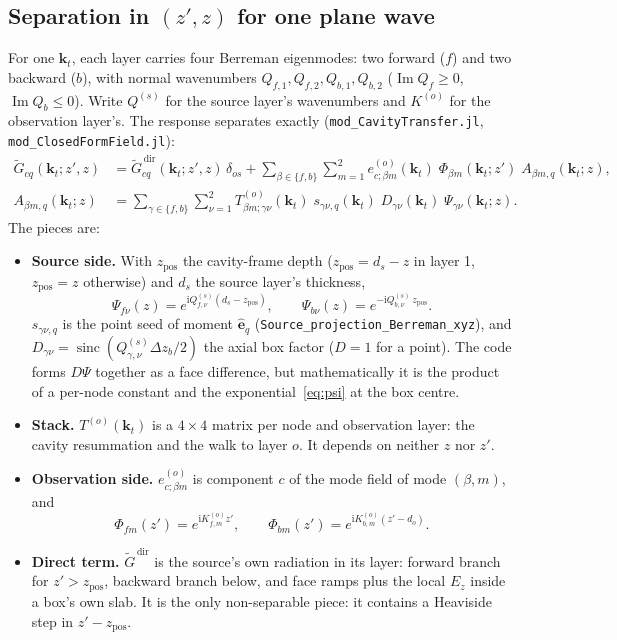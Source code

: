 \documentclass[11pt,a4paper]{article}
\newcommand{\code}[1]{\texttt{#1}}
\newcommand{\kt}{\mathbf{k}_t}
\newcommand{\ii}{\mathrm{i}}
\newcommand{\sinc}{\operatorname{sinc}}
\theoremstyle{remark}
\begin{document}
\subsection{Separation in $(z', z)$ for one plane wave}

For one $\kt$, each layer carries four Berreman eigenmodes: two forward ($f$) and two
backward ($b$), with normal wavenumbers $Q_{f,1}, Q_{f,2}, Q_{b,1}, Q_{b,2}$
($\operatorname{Im} Q_f \ge 0$, $\operatorname{Im} Q_b \le 0$). Write $Q^{(s)}$ for the
source layer's wavenumbers and $K^{(o)}$ for the observation layer's. The response
separates exactly (\code{mod\_CavityTransfer.jl}, \code{mod\_ClosedFormField.jl}):
\begin{align}
  \widetilde{G}_{cq}(\kt; z', z)
  &= \widetilde{G}^{\,\mathrm{dir}}_{cq}(\kt; z', z)\,\delta_{os}
   + \sum_{\beta\in\{f,b\}}\sum_{m=1}^{2}
     e^{(o)}_{c;\beta m}(\kt)\;\Phi_{\beta m}(\kt; z')\; A_{\beta m, q}(\kt; z),
  \label{eq:separation}\\
  A_{\beta m, q}(\kt; z)
  &= \sum_{\gamma\in\{f,b\}}\sum_{\nu=1}^{2}
     T^{(o)}_{\beta m;\gamma\nu}(\kt)\; s_{\gamma\nu, q}(\kt)\; D_{\gamma\nu}(\kt)\; \Psi_{\gamma\nu}(\kt; z).
  \label{eq:amplitude}
\end{align}
The pieces are:
\begin{itemize}[leftmargin=*]
\item \textbf{Source side.} With $z_{\mathrm{pos}}$ the cavity-frame depth ($z_{\mathrm{pos}} = d_s - z$ in layer 1,
  $z_{\mathrm{pos}}=z$ otherwise) and $d_s$ the source layer's thickness,
  \begin{equation}
    \Psi_{f\nu}(z) = e^{\ii Q^{(s)}_{f,\nu}(d_s - z_{\mathrm{pos}})},
    \qquad
    \Psi_{b\nu}(z) = e^{-\ii Q^{(s)}_{b,\nu}\, z_{\mathrm{pos}}}.
    \label{eq:psi}
  \end{equation}
  $s_{\gamma\nu,q}$ is the point seed of moment $\hat{\mathbf{e}}_q$ (\code{Source\_projection\_Berreman\_xyz}),
  and $D_{\gamma\nu} = \sinc(Q^{(s)}_{\gamma,\nu}\Delta z_b/2)$ the axial box factor ($D=1$ for a point).
  The code forms $D\Psi$ together as a face difference, but mathematically it is the
  product of a per-node constant and the exponential~\eqref{eq:psi} at the box centre.
\item \textbf{Stack.} $T^{(o)}(\kt)$ is a $4\times4$ matrix per node and observation layer: the
  cavity resummation and the walk to layer $o$. It depends on neither $z$ nor $z'$.
\item \textbf{Observation side.} $e^{(o)}_{c;\beta m}$ is component $c$ of the mode field of mode $(\beta,m)$, and
  \begin{equation}
    \Phi_{f m}(z') = e^{\ii K^{(o)}_{f,m} z'},
    \qquad
    \Phi_{b m}(z') = e^{\ii K^{(o)}_{b,m}(z' - d_o)}.
    \label{eq:phi}
  \end{equation}
\item \textbf{Direct term.} $\widetilde{G}^{\,\mathrm{dir}}$ is the source's own radiation in its layer: forward
  branch for $z' > z_{\mathrm{pos}}$, backward branch below, and face ramps plus the local $E_z$
  inside a box's own slab. It is the only non-separable piece: it contains a Heaviside
  step in $z'-z_{\mathrm{pos}}$.
\end{itemize}
\end{document}
